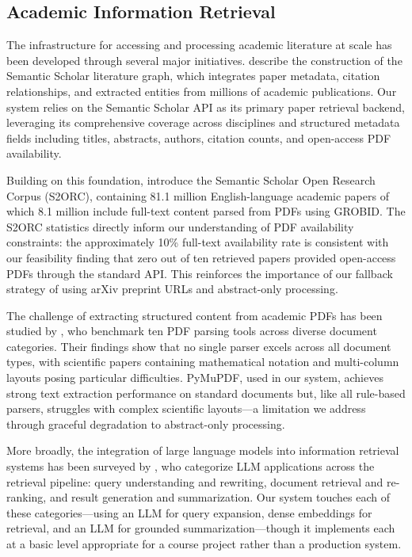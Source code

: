 \documentclass[12pt,a4paper]{article}
\begin{document}
\subsection{Academic Information Retrieval}

The infrastructure for accessing and processing academic literature at scale has been developed through several major initiatives. \citet{ammar2018semanticscholar} describe the construction of the Semantic Scholar literature graph, which integrates paper metadata, citation relationships, and extracted entities from millions of academic publications. Our system relies on the Semantic Scholar API as its primary paper retrieval backend, leveraging its comprehensive coverage across disciplines and structured metadata fields including titles, abstracts, authors, citation counts, and open-access PDF availability.

Building on this foundation, \citet{lo2020s2orc} introduce the Semantic Scholar Open Research Corpus (S2ORC), containing 81.1 million English-language academic papers of which 8.1 million include full-text content parsed from PDFs using GROBID. The S2ORC statistics directly inform our understanding of PDF availability constraints: the approximately 10\% full-text availability rate is consistent with our feasibility finding that zero out of ten retrieved papers provided open-access PDFs through the standard API. This reinforces the importance of our fallback strategy of using arXiv preprint URLs and abstract-only processing.

The challenge of extracting structured content from academic PDFs has been studied by \citet{adhikari2024pdfparsing}, who benchmark ten PDF parsing tools across diverse document categories. Their findings show that no single parser excels across all document types, with scientific papers containing mathematical notation and multi-column layouts posing particular difficulties. PyMuPDF, used in our system, achieves strong text extraction performance on standard documents but, like all rule-based parsers, struggles with complex scientific layouts---a limitation we address through graceful degradation to abstract-only processing.

More broadly, the integration of large language models into information retrieval systems has been surveyed by \citet{zhu2023llmir}, who categorize LLM applications across the retrieval pipeline: query understanding and rewriting, document retrieval and re-ranking, and result generation and summarization. Our system touches each of these categories---using an LLM for query expansion, dense embeddings for retrieval, and an LLM for grounded summarization---though it implements each at a basic level appropriate for a course project rather than a production system.
\end{document}
